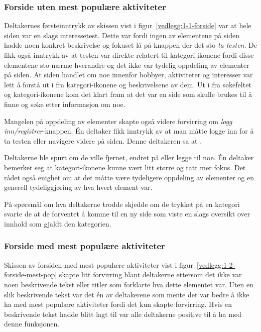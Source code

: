 \subsubsection{Forside uten mest populære aktiviteter}
\label{section:test-forside-1.0}
Deltakernes førsteinntrykk av skissen vist i figur~\ref{vedlegg:1-1-forside} var at hele siden var en slags interessetest. Dette var fordi ingen av elementene på siden hadde noen konkret beskrivelse og fokuset lå på knappen der det sto {\em  ta testen}. De fikk også inntrykk av at testen var direkte relatert til kategori-ikonene fordi disse elementene sto nærme hverandre og det ikke var tydelig oppdeling av elementer på siden. At siden handlet om noe innenfor hobbyer, aktiviteter og interesser var lett å forstå ut i fra kategori-ikonene og beskrivelsene av dem. Ut i fra søkefeltet og kategori-ikonene kom det klart fram at det var en side som skulle brukes til å finne og søke etter informasjon om noe. 

Mangelen på oppdeling av elementer skapte også videre forvirring om {\em  logg inn/registrer}-knappen. Én deltaker fikk inntrykk av at man måtte logge inn for å ta testen eller navigere videre på siden. Denne deltakeren sa at .

Deltakerne ble spurt om de ville fjernet, endret på eller legge til noe. Én deltaker bemerket seg at kategori-ikonene kunne vært litt større og tatt mer fokus. Det rådet også enighet om at det måtte være tydeligere oppdeling av elementer og en generell tydeliggjøring av hva hvert element var.

På spørsmål om hva deltakerne trodde skjedde om de trykket på en kategori svarte de at de forventet å komme til en ny side som viste en slags oversikt over innhold som gjaldt den kategorien.

\subsubsection{Forside med mest populære aktiviteter}
Skissen av forsiden med mest populære aktiviteter vist i figur~\ref{vedlegg:1-2-forside-mest-pop} skapte litt forvirring blant deltakerne ettersom det ikke var noen beskrivende tekst eller titler som forklarte hva dette elementet var. Uten en slik beskrivende tekst var det én av deltakerene som mente det var bedre å ikke ha med mest populære aktiviteter fordi det kun skapte forvirring. Hvis en beskrivende tekst hadde blitt lagt til var alle deltakerne positive til å ha med denne funksjonen. 

